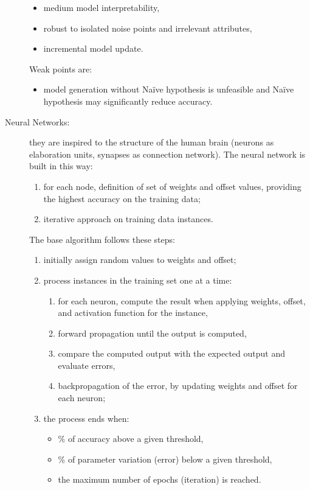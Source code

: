 \begin{description}
\begin{itemize}
		\item
		medium model interpretability,
		\item
		robust to isolated noise points and irrelevant attributes,
		\item
		incremental model update.
	\end{itemize}
	Weak points are:
	\begin{itemize}
		\item
		model generation without Na\"{i}ve hypothesis is unfeasible and Na\"{i}ve hypothesis may significantly reduce accuracy.
	\end{itemize}
	\item[Neural Networks:] they are inspired to the structure of the human brain (neurons as elaboration units, synapses as connection network).
	The neural network is built in this way:
	\begin{enumerate}
		\item
		for each node, definition of set of weights and offset values, providing the highest accuracy on the training data;
		\item
		iterative approach on training data instances.
	\end{enumerate}
	The base algorithm follows these steps:
	\begin{enumerate}
		\item
		initially assign random values to weights and offset;
		\item
		process instances in the training set one at a time:
		\begin{enumerate}
			\item
			for each neuron, compute the result when applying weights, offset, and activation function for the instance,
			\item
			forward propagation until the output is computed,
			\item
			compare the computed output with the expected output and evaluate errors,
			\item
			backpropagation of the error, by updating weights and offset for each neuron;
		\end{enumerate}
		\item
		the process ends when:
		\begin{itemize}
			\item
			\% of accuracy above a given threshold,
			\item
			\% of parameter variation (error) below a given threshold,
			\item
			the maximum number of epochs (iteration) is reached.

\end{itemize}
\end{enumerate}
\end{description}

